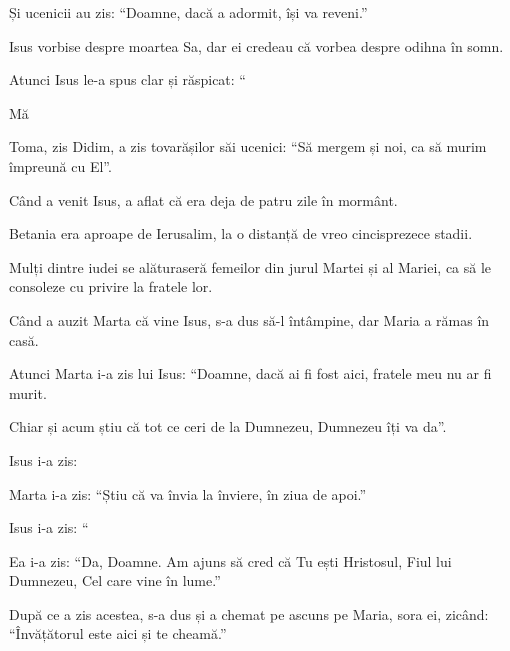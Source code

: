 {\par }{\PP {}Și ucenicii au zis: “Doamne, dacă a adormit, își va reveni.”


\par }{\PP {}Isus vorbise despre moartea Sa, dar ei credeau că vorbea despre odihna în somn.

Atunci Isus le-a spus clar și răspicat: “{}

Mă
{}


\par }{\PP {}Toma, zis Didim, a zis tovarășilor săi ucenici: “Să mergem și noi, ca să murim împreună cu El”.


\par }{\PP {}Când a venit Isus, a aflat că era deja de patru zile în mormânt.

Betania era aproape de Ierusalim, la o distanță de vreo cincisprezece stadii.

Mulți dintre iudei se alăturaseră femeilor din jurul Martei și al Mariei, ca să le consoleze cu privire la fratele lor.

Când a auzit Marta că vine Isus, s-a dus să-l întâmpine, dar Maria a rămas în casă.

Atunci Marta i-a zis lui Isus: “Doamne, dacă ai fi fost aici, fratele meu nu ar fi murit.

Chiar și acum știu că tot ce ceri de la Dumnezeu, Dumnezeu îți va da”.


\par }{\PP {}Isus i-a zis:
{}


\par }{\PP {}Marta i-a zis: “Știu că va învia la înviere, în ziua de apoi.”


\par }{\PP {}Isus i-a zis: “{}



\par }{\PP {}Ea i-a zis: “Da, Doamne. Am ajuns să cred că Tu ești Hristosul, Fiul lui Dumnezeu, Cel care vine în lume.”


\par }{\PP {}După ce a zis acestea, s-a dus și a chemat pe ascuns pe Maria, sora ei, zicând: “Învățătorul este aici și te cheamă.”


}
